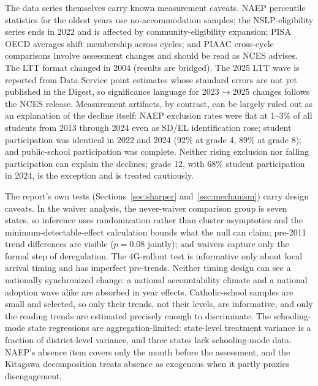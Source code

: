 \documentclass[11pt]{article}
\begin{document}
The data series themselves carry known measurement caveats. NAEP percentile statistics for the oldest years use no-accommodation samples; the NSLP-eligibility series ends in 2022 and is affected by community-eligibility expansion; PISA OECD averages shift membership across cycles; and PIAAC cross-cycle comparisons involve assessment changes and should be read as NCES advises. The LTT format changed in 2004 (results are bridged). The 2025 LTT wave is reported from Data Service point estimates whose standard errors are not yet published in the Digest, so significance language for 2023$\rightarrow$2025 changes follows the NCES release. Measurement artifacts, by contrast, can be largely ruled out as an explanation of the decline itself: NAEP exclusion rates were flat at 1--3\% of all students from 2013 through 2024 even as SD/EL identification rose; student participation was identical in 2022 and 2024 (92\% at grade 4, 89\% at grade 8); and public-school participation was complete. Neither rising exclusion nor falling participation can explain the declines; grade 12, with 68\% student participation in 2024, is the exception and is treated cautiously.

The report's own tests (Sections~\ref{sec:sharper} and~\ref{sec:mechanism}) carry design caveats. In the waiver analysis, the never-waiver comparison group is seven states, so inference uses randomization rather than cluster asymptotics and the minimum-detectable-effect calculation bounds what the null can claim; pre-2011 trend differences are visible ($p=0.08$ jointly); and waivers capture only the formal step of deregulation. The 4G-rollout test is informative only about local arrival timing and has imperfect pre-trends. Neither timing design can see a nationally synchronized change: a national accountability climate and a national adoption wave alike are absorbed in year effects. Catholic-school samples are small and selected, so only their trends, not their levels, are informative, and only the reading trends are estimated precisely enough to discriminate. The schooling-mode state regressions are aggregation-limited: state-level treatment variance is a fraction of district-level variance, and three states lack schooling-mode data. NAEP's absence item covers only the month before the assessment, and the Kitagawa decomposition treats absence as exogenous when it partly proxies disengagement.
\end{document}
